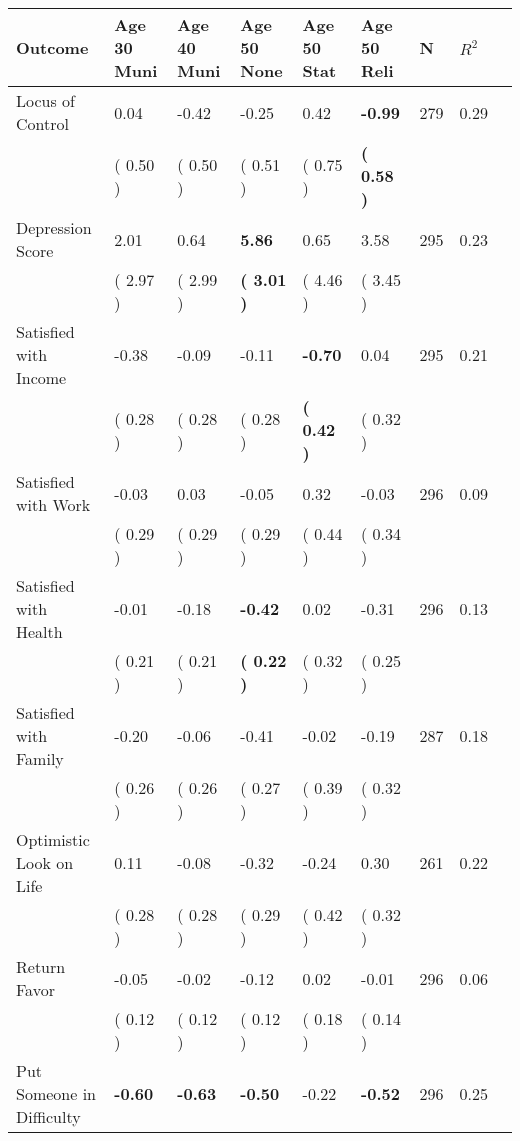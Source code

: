 \begin{tabular}{L{6.2cm} C{1.8cm} C{1.8cm} C{1.8cm} C{1.8cm} C{1.8cm} C{1.8cm} C{0.3cm} C{0.3cm}}
\toprule
 \textbf{Outcome} & \textbf{Age 30 Muni} & \textbf{Age 40 Muni} & \textbf{Age 50 None} & \textbf{Age 50 Stat} & \textbf{Age 50 Reli} & \textbf{N} & \textbf{$ R^2$} \\
\midrule
Locus of Control &      0.04 &     -0.42 &     -0.25 &      0.42 & \textbf{    -0.99}  & 279 &       0.29 \\ 
 & (     0.50 ) & (     0.50 ) & (     0.51 ) & (     0.75 ) & \textbf{(     0.58 )}  & \\
Depression Score &      2.01 &      0.64 & \textbf{     5.86} &      0.65 &      3.58  & 295 &       0.23 \\ 
 & (     2.97 ) & (     2.99 ) & \textbf{(     3.01 )} & (     4.46 ) & (     3.45 )  & \\
Satisfied with Income &     -0.38 &     -0.09 &     -0.11 & \textbf{    -0.70} &      0.04  & 295 &       0.21 \\ 
 & (     0.28 ) & (     0.28 ) & (     0.28 ) & \textbf{(     0.42 )} & (     0.32 )  & \\
Satisfied with Work &     -0.03 &      0.03 &     -0.05 &      0.32 &     -0.03  & 296 &       0.09 \\ 
 & (     0.29 ) & (     0.29 ) & (     0.29 ) & (     0.44 ) & (     0.34 )  & \\
Satisfied with Health &     -0.01 &     -0.18 & \textbf{    -0.42} &      0.02 &     -0.31  & 296 &       0.13 \\ 
 & (     0.21 ) & (     0.21 ) & \textbf{(     0.22 )} & (     0.32 ) & (     0.25 )  & \\
Satisfied with Family &     -0.20 &     -0.06 &     -0.41 &     -0.02 &     -0.19  & 287 &       0.18 \\ 
 & (     0.26 ) & (     0.26 ) & (     0.27 ) & (     0.39 ) & (     0.32 )  & \\
Optimistic Look on Life &      0.11 &     -0.08 &     -0.32 &     -0.24 &      0.30  & 261 &       0.22 \\ 
 & (     0.28 ) & (     0.28 ) & (     0.29 ) & (     0.42 ) & (     0.32 )  & \\
Return Favor &     -0.05 &     -0.02 &     -0.12 &      0.02 &     -0.01  & 296 &       0.06 \\ 
 & (     0.12 ) & (     0.12 ) & (     0.12 ) & (     0.18 ) & (     0.14 )  & \\
Put Someone in Difficulty & \textbf{    -0.60} & \textbf{    -0.63} & \textbf{    -0.50} &     -0.22 & \textbf{    -0.52}  & 296 &       0.25 \\ 

\end{tabular}
